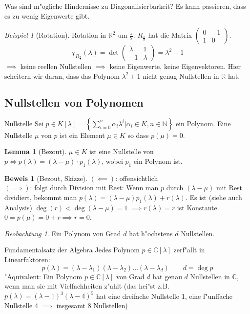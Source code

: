 \documentclass[11pt]{article}
\newcommand{\gq}[1]{\glqq{}#1\grqq{}} %
\DeclareMathOperator{\mDeg}{deg}
\theoremstyle{remark}
\newtheorem{exa}{Beispiel}[section]
\newtheorem{beobachtung}{Beobachtung}
\theoremstyle{definition}
\newtheorem{prof}{Beweis}
\newtheorem*{lemma}{Lemma}
\theoremstyle{remark}
\begin{document}
Was sind m"ogliche Hindernisse zu Diagonalisierbarkeit?
Es kann passieren, dass es \gq{zu wenig} Eigenwerte gibt.
\begin{exa}[Rotation]
  Rotation in \(\mathbb{R}^2\) um \(\frac{\pi}{2}\): \(R_{\frac{\pi}{2}}\) hat die Matrix \(
  \begin{pmatrix}
    0 & -1 \\
    1 & 0
  \end{pmatrix}
  \).
  \[\chi_{R_{\frac{\pi}{2}}}(\lambda) = \det
    \begin{pmatrix}
      \lambda & 1\\
      -1 & \lambda
    \end{pmatrix}
    = \lambda^2 + 1
\] \(\implies\) keine reellen Nullstellen \(\implies\) keine Eigenwerte, keine Eigenvektoren. Hier scheitern wir daran, dass das Polynom \(\lambda^2+1\) nicht genug Nullstellen in \(\mathbb{R}\) hat.
\end{exa}

\subsection{Nullstellen von Polynomen}
\begin{definition}{Nullstelle}{}
  Sei \(p\in K[\lambda] = \left\{\sum_{i=0}^n\alpha_i\lambda^i|\alpha_i\in K, n\in\mathbb{N} \right\}\) ein Polynom. Eine Nullstelle \(\mu\) von \(p\) ist ein Element \(\mu\in K\) so dass \(p(\mu) = 0\).
\end{definition}
\begin{lemma}[Bezout]
  \(\mu\in K\) ist eine Nullstelle von \(p \iff p(\lambda) = (\lambda-\mu)\cdot p_1(\lambda)\), wobei \(p_1\) ein Polynom ist.
\end{lemma}
\begin{prof}[Bezout, Skizze]
  \((\impliedby)\): offensichtlich \\
  \((\implies)\): folgt durch Division mit Rest: Wenn man \(p\) durch \((\lambda-\mu)\) mit Rest dividiert, bekommt man \(p(\lambda) = (\lambda-\mu)p_1(\lambda) + r(\lambda)\). Es ist (siehe auch Analysis) \(\mDeg(r) < \mDeg(\lambda-\mu) = 1\) \(\implies r(\lambda)=r\) ist Konstante. \(0 = p(\mu) = 0 + r \implies r = 0\).
\end{prof}
\begin{beobachtung}
  Ein Polynom von Grad \(d\) hat h"ochstens \(d\) Nullstellen.
\end{beobachtung}
\begin{theo}{Fundamentalsatz der Algebra}
  Jedes Polynom \(p\in\mathbb{C}[\lambda]\) zerf"allt in Linearfaktoren:
  \[p(\lambda) = (\lambda - \lambda_1)(\lambda-\lambda_2)\dots(\lambda-\lambda_d) \qquad d = \mDeg p\]
  "Aquivalent: Ein Polynom \(p\in\mathbb{C}[\lambda]\) von Grad \(d\) hat genau \(d\) Nullstellen in \(\mathbb{C}\), wenn man sie mit Vielfachheiten z"ahlt (das hei"st z.B. \(p(\lambda) = (\lambda-1)^3(\lambda-4)^5\) hat eine dreifache Nullstelle 1, eine f"unffache Nullstelle 4 \(\implies\) insgesamt 8 Nullstellen)
\end{theo}
\end{document}

